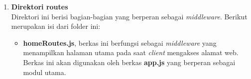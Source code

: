\begin{enumerate}
\begin{enumerate}
\begin{table}[H]
\begin{tabular}{|p{0.35cm}|p{4cm}|p{7cm}|}
			\end{tabular}
			\label{table:css_stylesheets}
		\end{table}
%			
%			
%			
%			
%			
%			
%			
%			
%			
	\end{enumerate}
	
	\item \textbf{Direktori routes} \\
	Direktori ini berisi bagian-bagian yang berperan sebagai \textit{middleware}. Berikut merupakan isi dari folder ini:
	\begin{itemize}
		\item \textbf{homeRoutes.js}, berkas ini berfungsi sebagai \textit{middleware} yang menampilkan halaman utama pada saat \textit{client} mengakses alamat web. Berkas ini akan digunakan oleh berkas \textbf{app.js} yang berperan sebagai modul utama.
	\end{itemize}


\end{enumerate}
